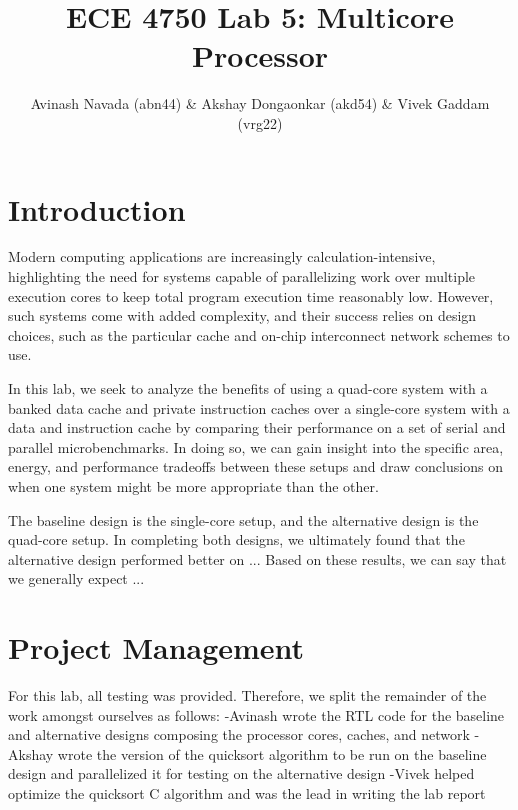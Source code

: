 \documentclass[10pt]{article}
\begin{document}
\title{ECE 4750 Lab 5: Multicore Processor}
\author{Avinash Navada (abn44) \& Akshay Dongaonkar (akd54) 
		\& Vivek Gaddam (vrg22)}
\maketitle


\section{Introduction}

Modern computing applications are increasingly calculation-intensive, highlighting the 
need for systems capable of parallelizing work over multiple execution cores to keep 
total program execution time reasonably low. However, such systems come with
added complexity, and their success relies on design choices, such as the particular
cache and on-chip interconnect network schemes to use. \par

In this lab, we seek to analyze the benefits of using a quad-core system with
a banked data cache and private instruction caches over a single-core system with a data
and instruction cache by comparing their performance on a set of serial and parallel microbenchmarks.
In doing so, we can gain insight into the specific area, energy, and performance tradeoffs between these setups
and draw conclusions on when one system might be more appropriate than the other.

The baseline design is the single-core setup, and the alternative design is the quad-core setup.
In completing both designs, we ultimately found that the alternative design performed better on ...
Based on these results, we can say that we generally expect ...



\section{Project Management}

% 
For this lab, all testing was provided. Therefore, we split the remainder of the work amongst ourselves as follows:
-Avinash wrote the RTL code for the baseline and alternative designs composing the processor cores, caches, and network
-Akshay wrote the version of the quicksort algorithm to be run on the baseline design and parallelized it for testing on the alternative design
-Vivek helped optimize the quicksort C algorithm and was the lead in writing the lab report
\end{document}
